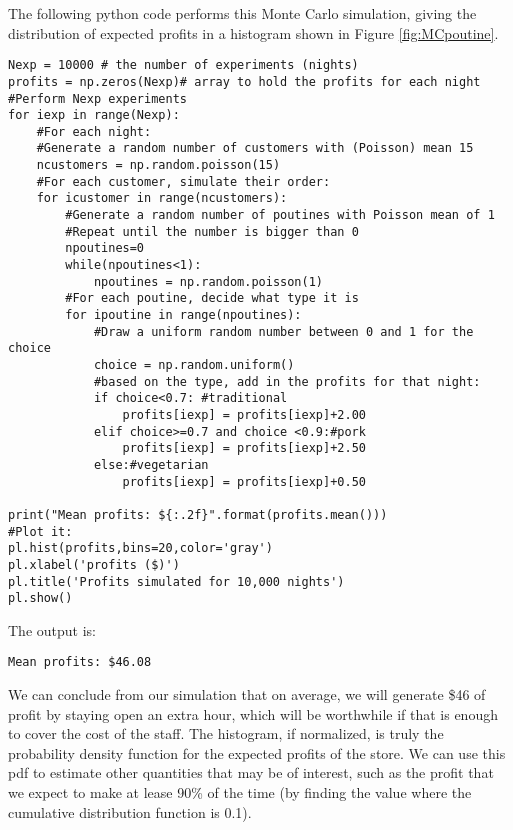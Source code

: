The following python code performs this Monte Carlo simulation, giving the distribution of expected profits in a histogram shown in Figure \ref{fig:MCpoutine}.

\begin{lstlisting}[frame=single] 
Nexp = 10000 # the number of experiments (nights)
profits = np.zeros(Nexp)# array to hold the profits for each night
#Perform Nexp experiments
for iexp in range(Nexp):
    #For each night:
    #Generate a random number of customers with (Poisson) mean 15
    ncustomers = np.random.poisson(15)
    #For each customer, simulate their order:
    for icustomer in range(ncustomers):
        #Generate a random number of poutines with Poisson mean of 1
        #Repeat until the number is bigger than 0
        npoutines=0
        while(npoutines<1):
            npoutines = np.random.poisson(1)
        #For each poutine, decide what type it is
        for ipoutine in range(npoutines):
            #Draw a uniform random number between 0 and 1 for the choice
            choice = np.random.uniform()
            #based on the type, add in the profits for that night:
            if choice<0.7: #traditional
                profits[iexp] = profits[iexp]+2.00 
            elif choice>=0.7 and choice <0.9:#pork
                profits[iexp] = profits[iexp]+2.50 
            else:#vegetarian
                profits[iexp] = profits[iexp]+0.50
                
print("Mean profits: ${:.2f}".format(profits.mean())) 
#Plot it:
pl.hist(profits,bins=20,color='gray')
pl.xlabel('profits ($)')
pl.title('Profits simulated for 10,000 nights')
pl.show()
\end{lstlisting}
The output is:
\begin{verbatim}
Mean profits: $46.08
\end{verbatim}

We can conclude from our simulation that on average, we will generate \$46 of profit by staying open an extra hour, which will be worthwhile if that is enough to cover the cost of the staff. The histogram, if normalized, is truly the probability density function for the expected profits of the store. We can use this pdf to estimate other quantities that may be of interest, such as the profit that we expect to make at lease 90\% of the time (by finding the value where the cumulative distribution function is 0.1). 

